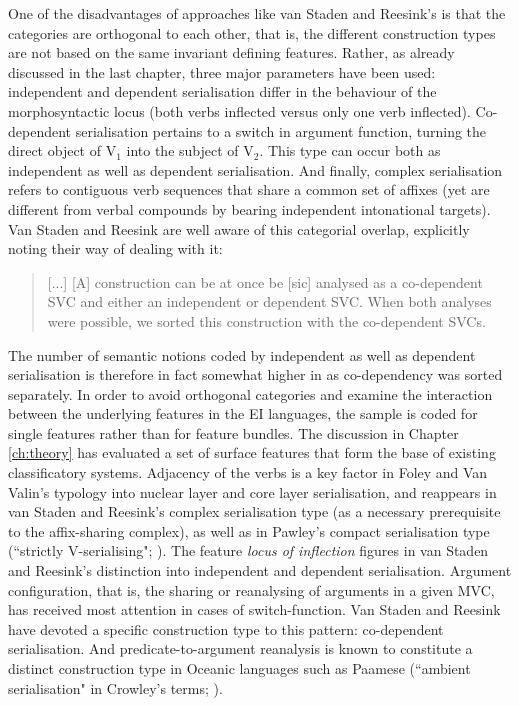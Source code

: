 One of the disadvantages of approaches like van Staden and Reesink's is that the categories are orthogonal to each other, that is, the different construction types are not based on the same invariant defining features. Rather, as already discussed in the last chapter, three major parameters have been used: independent and dependent serialisation differ in the behaviour of the morphosyntactic locus (both verbs inflected versus only one verb inflected). Co-dependent serialisation pertains to a switch in argument function, turning the direct object of V$_1$ into the subject of V$_2$. This type can occur both as independent as well as dependent serialisation. And finally, complex serialisation refers to contiguous verb sequences that share a common set of affixes (yet are different from verbal compounds by bearing independent intonational targets). Van Staden and Reesink are well aware of this categorial overlap, explicitly noting their way of dealing with it: 

\begin{quote}
[...] [A] construction can be at once be [sic] analysed as a co-dependent SVC and either an independent or dependent SVC. When both analyses were possible, we sorted this construction with the co-dependent SVCs. \citep[47]{vanstaden2008serial}
\end{quote}

The number of semantic notions coded by independent as well as dependent serialisation is therefore in fact somewhat higher in  as co-dependency was sorted separately. In order to avoid orthogonal categories and examine the interaction between the underlying features in the EI languages, the sample is coded for single features rather than for feature bundles. The discussion in Chapter \ref{ch:theory} has evaluated a set of surface features that form the base of existing classificatory systems. Adjacency of the verbs is a key factor in Foley and Van Valin's typology into nuclear layer and core layer serialisation, and reappears in van Staden and Reesink's complex serialisation type (as a necessary prerequisite to the affix-sharing complex), as well as in Pawley's compact serialisation type (``strictly V-serialising"; \citealt[172]{pawley2008serial}). The feature \textit{locus of inflection} figures in van Staden and Reesink's distinction into independent and dependent serialisation. Argument configuration, that is, the sharing or reanalysing of arguments in a given MVC, has received most attention in cases of switch-function. Van Staden and Reesink have devoted a specific construction type to this pattern: co-dependent serialisation. And predicate-to-argument reanalysis is known to constitute a distinct construction type in Oceanic languages such as Paamese (``ambient serialisation" in Crowley's terms; \citealt{crowley2002serial}).

